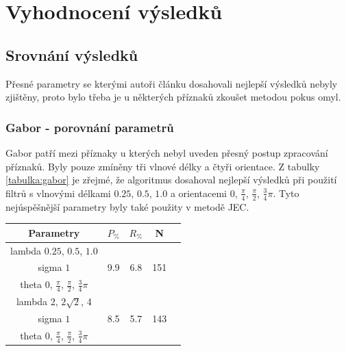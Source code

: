 \documentclass[czech,BP]{thesiskiv}
\begin{document}
\chapter{Vyhodnocení výsledků}

\section{Srovnání výsledků}
Přesné parametry se kterými autoři článku \cite{JEC2} dosahovali nejlepší výsledků nebyly zjištěny, proto bylo třeba je u některých příznaků zkoušet metodou pokus omyl. 


\subsection{Gabor - porovnání parametrů}
Gabor patří mezi příznaky u kterých nebyl uveden přesný postup zpracování příznaků. Byly pouze zmíněny tři vlnové délky a čtyři orientace. Z tabulky \ref{tabulka:gabor} je zřejmé, že algoritmus dosahoval nejlepší výsledků při použití filtrů s vlnovými délkami $0.25$, $0.5$, $1.0$ a orientacemi $0$, $\frac{\pi}{4}$, $\frac{\pi}{2}$, $\frac{3}{4}\pi$. Tyto nejúspěšnější parametry byly také použity v metodě JEC.
\begin{center}
\begin{tabular}{ |c|c|c|c|c| }
\hline
Parametry & $P_{\%}$ & $R_{\%}$ & N \\ \hline
 lambda $0.25$, $0.5$, $1.0$ & \multirow{3}{*}{9.9} & \multirow{3}{*}{6.8} & \multirow{3}{*}{151} \\
 sigma $1$ & & & \\
 theta $0$, $\frac{\pi}{4}$, $\frac{\pi}{2}$, $\frac{3}{4}\pi$ & & & \\ \hline
 lambda 2, $2\sqrt{2}$, 4 & \multirow{3}{*}{8.5} & \multirow{3}{*}{5.7} & \multirow{3}{*}{143} \\
 sigma $1$ & & & \\
 theta $0$, $\frac{\pi}{4}$, $\frac{\pi}{2}$, $\frac{3}{4}\pi$ & & & \\ 
\hline
\end{tabular}
\label{tabulka:gabor}
\end{center}
\end{document}
